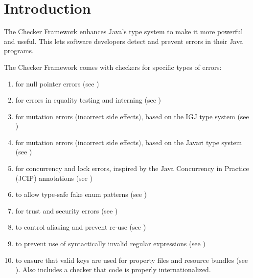 \htmlhr
\chapter{Introduction\label{introduction}}

The Checker Framework enhances Java's type system to make it more powerful
and useful.
This lets software developers detect and
prevent errors in their Java programs.

The Checker Framework comes with checkers for specific types of errors:

\begin{enumerate}

\item
   for null pointer errors
  (see )
\item
   for errors in equality
  testing and interning (see )
\item
   for mutation errors (incorrect
  side effects), based on the IGJ type system (see
  )
\item
   for mutation errors
  (incorrect side effects), based on the Javari type system (see
  )
\item
   for concurrency and lock errors,
  inspired by the Java Concurrency in Practice (JCIP) annotations (see
  )
\item
   to allow type-safe fake enum
  patterns (see )
\item
   for trust and security errors
  (see )
\item
   to control aliasing and prevent
  re-use (see )
\item
   to prevent use of syntactically
  invalid regular expressions (see )
\item
   to ensure that valid
  keys are used for property files and resource bundles (see
  ).
  Also includes a checker that code is properly internationalized.

\end{enumerate}
